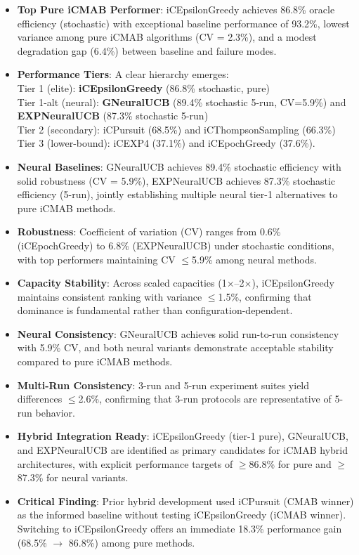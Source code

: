 \documentclass[12pt,a4paper]{article}
\newcommand{\primarytext}[1]{\textcolor{primaryblue}{\textbf{#1}}}
\newcommand{\secondarytext}[1]{\textcolor{secondaryblue}{\textbf{#1}}}
\newcommand{\success}[1]{\textcolor{accentgreen}{\textbf{#1}}}
\newcommand{\warning}[1]{\textcolor{warningred}{\textbf{#1}}}
\newcommand{\legacy}[1]{\textcolor{legacycolor}{\textbf{#1}}}
\newcommand{\neural}[1]{\textcolor{neuralcolor}{\textbf{#1}}}
\begin{document}
\begin{tcolorbox}[colback=highlightgray,colframe=primaryblue,title=\textbf{Executive Summary}]
\begin{itemize}
\item \primarytext{Top Pure iCMAB Performer}: iCEpsilonGreedy achieves 86.8\% oracle efficiency (stochastic) with exceptional baseline performance of 93.2\%, lowest variance among pure iCMAB algorithms (CV = 2.3\%), and a modest degradation gap (6.4\%) between baseline and failure modes.
\item \secondarytext{Performance Tiers}: A clear hierarchy emerges: \\
  \quad Tier 1 (elite): \primarytext{iCEpsilonGreedy} (86.8\% stochastic, pure) \\
  \quad Tier 1-alt (neural): \neural{GNeuralUCB} (89.4\% stochastic 5-run, CV=5.9\%) and \legacy{EXPNeuralUCB} (87.3\% stochastic 5-run) \\
  \quad Tier 2 (secondary): iCPursuit (68.5\%) and iCThompsonSampling (66.3\%) \\
  \quad Tier 3 (lower-bound): iCEXP4 (37.1\%) and iCEpochGreedy (37.6\%).
\item \neural{Neural Baselines}: GNeuralUCB achieves 89.4\% stochastic efficiency with solid robustness (CV = 5.9\%), EXPNeuralUCB achieves 87.3\% stochastic efficiency (5-run), jointly establishing multiple neural tier-1 alternatives to pure iCMAB methods.
\item \success{Robustness}: Coefficient of variation (CV) ranges from 0.6\% (iCEpochGreedy) to 6.8\% (EXPNeuralUCB) under stochastic conditions, with top performers maintaining CV $\leq$5.9\% among neural methods.
\item \success{Capacity Stability}: Across scaled capacities (1$\times$--2$\times$), iCEpsilonGreedy maintains consistent ranking with variance $\leq$1.5\%, confirming that dominance is fundamental rather than configuration-dependent.
\item \neural{Neural Consistency}: GNeuralUCB achieves solid run-to-run consistency with 5.9\% CV, and both neural variants demonstrate acceptable stability compared to pure iCMAB methods.
\item \success{Multi-Run Consistency}: 3-run and 5-run experiment suites yield differences $\leq$2.6\%, confirming that 3-run protocols are representative of 5-run behavior.
\item \primarytext{Hybrid Integration Ready}: iCEpsilonGreedy (tier-1 pure), GNeuralUCB, and EXPNeuralUCB are identified as primary candidates for iCMAB hybrid architectures, with explicit performance targets of $\geq$86.8\% for pure and $\geq$87.3\% for neural variants.
\item \warning{Critical Finding}: Prior hybrid development used iCPursuit (CMAB winner) as the informed baseline without testing iCEpsilonGreedy (iCMAB winner). Switching to iCEpsilonGreedy offers an immediate 18.3\% performance gain (68.5\% $\rightarrow$ 86.8\%) among pure methods.
\end{itemize}
\end{tcolorbox}
\end{document}
